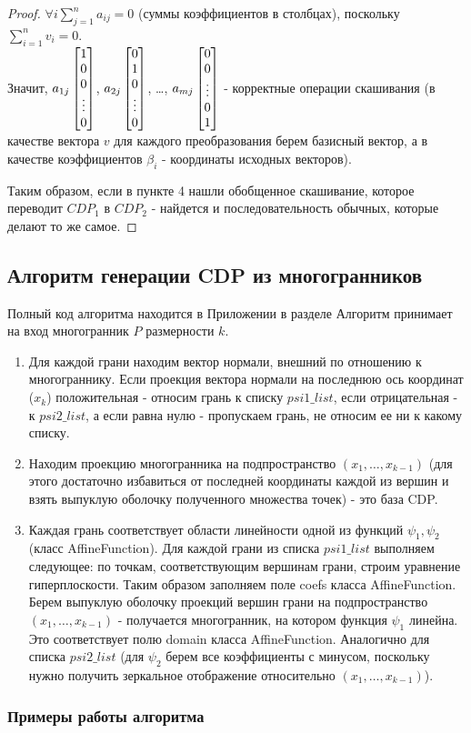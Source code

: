 \documentclass[fontsize=14pt]{scrartcl}
\theoremstyle{definition}
\begin{document}
\begin{proof}
$\forall i \sum_{j=1}^na_{ij} = 0$ (суммы коэффициентов в столбцах), поскольку $\sum_{i=1}^{n} v_i = 0$. 
\\
Значит, $a_{1j}\begin{bmatrix} 1 \\ 0 \\ 0 \\ \vdots \\ 0 \end{bmatrix}$, $a_{2j}\begin{bmatrix} 0 \\ 1 \\ 0 \\ \vdots \\ 0 \end{bmatrix}$, \dots, $a_{mj}\begin{bmatrix} 0 \\ 0 \\ \vdots \\ 0 \\ 1 \end{bmatrix}$ -  корректные операции скашивания (в качестве вектора $v$ для каждого преобразования берем базисный вектор, а в качестве коэффициентов $\beta_i$ - координаты исходных векторов).

Таким образом, если в пункте 4 нашли обобщенное скашивание, которое переводит $CDP_1$ в $CDP_2$ - найдется и последовательность обычных, которые делают то же самое.
\end{proof}

\subsection{Алгоритм генерации CDP из многогранников}
Полный код алгоритма находится в Приложении в разделе \pageref{gen}
Алгоритм принимает на вход многогранник $P$ размерности $k$.
\begin{enumerate}
	\item Для каждой грани находим вектор нормали, внешний по отношению к многограннику. Если проекция вектора нормали на последнюю ось координат ($x_k$) положительная - относим грань к списку $psi1\_list$, если отрицательная - к $psi2\_list$, а если равна нулю - пропускаем грань, не относим ее ни к какому списку.
	\item Находим проекцию многогранника на подпространство $(x_1, \dots, x_{k-1})$ (для этого достаточно избавиться от последней координаты каждой из вершин и взять выпуклую оболочку полученного множества точек) - это база CDP.
	\item Каждая грань соответствует области линейности одной из функций $\psi_1, \psi_2$ (класс AffineFunction). Для каждой грани из списка $psi1\_list$ выполняем следующее: по точкам, соответствующим вершинам грани, строим уравнение гиперплоскости. Таким образом заполняем поле coefs  класса AffineFunction. Берем выпуклую оболочку проекций вершин грани на подпространство $(x_1, \dots, x_{k-1})$ - получается многогранник, на котором функция $\psi_1$ линейна. Это соответствует полю domain класса AffineFunction. Аналогично для списка  $psi2\_list$ (для $\psi_2$ берем все коэффициенты с минусом, поскольку нужно получить зеркальное отображение относительно $(x_1, \dots, x_{k-1})$).
\end{enumerate}

\subsubsection{Примеры работы алгоритма}
\end{document}
